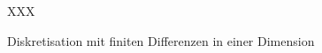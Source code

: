 %
%
%
\begin{figure}
\centering
\vspace*{2cm}
XXX
\vspace*{2cm}
\caption{Diskretisation mit finiten Differenzen in einer Dimension
\label{buch:pdenumerik:fdm:fig:1d}}
\end{figure}
